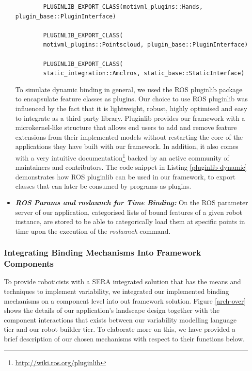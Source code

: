 \documentclass[conference]{IEEEtran}
\newcommand{\foot}[1]{\footnote{\url{#1}}}
\begin{document}
\begin{itemize}
\begin{listing}[H]
\begin{verbatim}
		PLUGINLIB_EXPORT_CLASS(motivml_plugins::Hands, plugin_base::PluginInterface)
		
		PLUGINLIB_EXPORT_CLASS(
		motivml_plugins::Pointscloud, plugin_base::PluginInterface)
		
		PLUGINLIB_EXPORT_CLASS(
		static_integration::Amclros, static_base::StaticInterface)
		\end{verbatim}
		\label{pluginlib-dynamic}
	\end{listing}

To simulate dynamic binding in general, we used the ROS pluginlib package to encapsulate feature classes as plugins. Our choice to use ROS pluginlib was influenced by the fact that it is lightweight, robust, highly optimised and easy to integrate as a third party library. Pluginlib provides our framework with a microkernel-like structure that allows end users to add and remove feature extensions from their implemented models without restarting the core of the applications they have built with our framework. In addition, it also comes with a very intuitive documentation\foot{http://wiki.ros.org/pluginlib} backed by an active community of maintainers and contributors. The code snippet in Listing \ref{pluginlib-dynamic} demonstrates how ROS pluginlib can be used in our framework, to export classes that can later be consumed by programs as plugins.\\

\item \textit{\textbf{ROS Params and roslaunch for Time Binding:}} On the ROS parameter server of our application, categorised lists of bound features of a given robot instance, are stored to be able to categorically load them at specific points in time upon the execution of the \textit{roslaunch} command.
\end{itemize}
\subsubsection{Integrating Binding Mechanisms Into Framework Components}
To provide roboticists with a SERA integrated solution that has the means
and techniques to implement variability, we integrated our implemented binding mechanisms on a component level into out framework solution.  Figure \ref{arch-over} shows the details of our application's landscape design together with the component interactions that exists between our variability modelling language tier and our robot builder tier. To elaborate more on this, we have provided a brief description of our chosen mechanisms with respect to their functions below.
\end{document}
